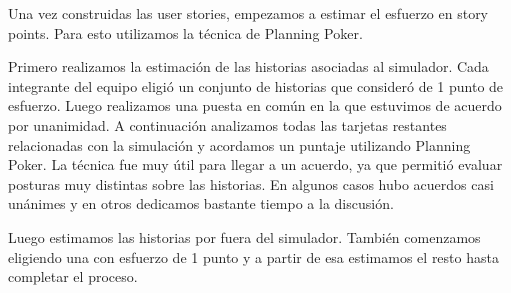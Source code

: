 Una vez construidas las user stories, empezamos a estimar el esfuerzo en story points. Para esto utilizamos la técnica de Planning Poker.

Primero realizamos la estimación de las historias asociadas al simulador. Cada integrante del equipo eligió un conjunto de historias 
que consideró de 1 punto de esfuerzo. Luego realizamos una puesta en común en la que estuvimos de acuerdo por unanimidad. A continuación
analizamos todas las tarjetas restantes relacionadas con la simulación y acordamos un puntaje utilizando Planning Poker. La técnica
fue muy útil para llegar a un acuerdo, ya que permitió evaluar posturas muy distintas sobre las historias. En algunos casos hubo acuerdos casi
unánimes y en otros dedicamos bastante tiempo a la discusi\'on.

Luego estimamos las historias por fuera del simulador. También comenzamos eligiendo una con esfuerzo de 1 punto y a partir de esa estimamos
el resto hasta completar el proceso.